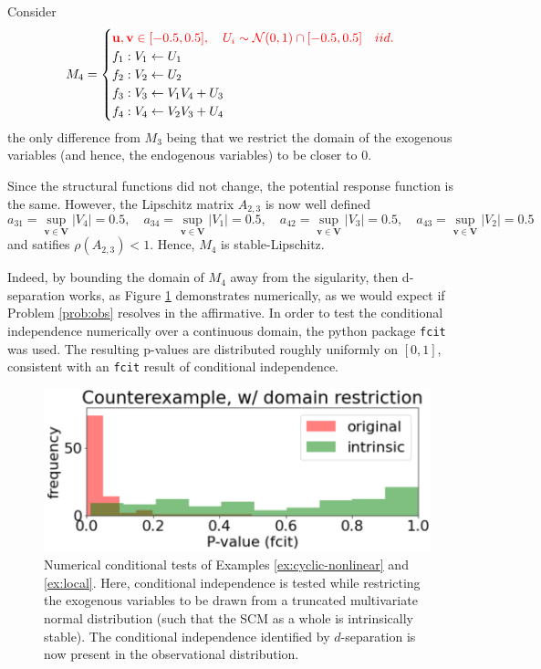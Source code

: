 \documentclass[12pt]{article}
\begin{document}
\begin{example}\label{ex:local}
Consider
\[
M_4 = 
\begin{cases}
\color{red}\mathbf{u}, \mathbf{v}\in [-0.5,0.5], \quad U_i \sim \mathcal{N}(0,1)\cap [-0.5,0.5] \quad iid. \color{black}\\
f_1:V_1\leftarrow U_1 \\
f_2:V_2\leftarrow U_2 \\
f_3:V_3\leftarrow V_1V_4+U_3 \\
f_4:V_4\leftarrow V_2V_3+U_4
\end{cases}
\]
the only difference from $M_3$ being that we restrict the domain of the exogenous variables (and hence, the endogenous variables) to be closer to $0$. 

Since the structural functions did not change, the potential response function is the same. However, the Lipschitz matrix $A_{2,3}$ is now well defined
\[
a_{31} = \sup_{\mathbf{v}\in\mathbf{V}}\lvert V_4\rvert = 0.5, \quad
a_{34} = \sup_{\mathbf{v}\in\mathbf{V}}\lvert V_1\rvert = 0.5,  \quad
a_{42} = \sup_{\mathbf{v}\in\mathbf{V}}\lvert V_3\rvert = 0.5,  \quad
a_{43} = \sup_{\mathbf{v}\in\mathbf{V}}\lvert V_2\rvert = 0.5 
\]
and satifies $\rho(A_{2,3})<1$. Hence, $M_4$ is stable-Lipschitz.
\end{example}

Indeed, by bounding the domain of $M_4$ away from the sigularity, then d-separation works, as Figure \ref{fig:counterexample_domain_restriction} demonstrates numerically, as we would expect if Problem \ref{prob:obs} resolves in the affirmative.
In order to test the conditional independence numerically over a continuous domain, the python package \verb|fcit| \cite{fcit} was used. The resulting p-values are distributed roughly uniformly on $[0,1]$, consistent with an \verb|fcit| result of conditional independence.


\begin{figure}
\centering
\includegraphics[width=.5\linewidth]{pics/my_own/counterexample_domain_restriction.png}
\caption{Numerical conditional tests of Examples \ref{ex:cyclic-nonlinear} and \ref{ex:local}. Here, conditional independence is tested while restricting the exogenous variables to be drawn from a truncated multivariate normal distribution (such that the SCM as a whole is intrinsically stable). The conditional independence identified by $d$-separation is now present in the observational distribution.}
\label{fig:counterexample_domain_restriction}
\end{figure}
\end{document}
